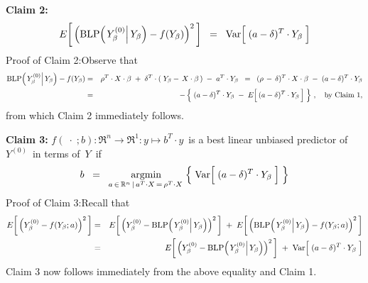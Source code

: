 \begin{enumerate}
	\vskip 0.8cm
	\noindent
	\textbf{Claim 2:}
	\begin{equation*}
	E\!\left[\,\left(\blp\!\left(\left.Y^{(0)}_{\beta}\right\vert Y_{\beta}\right) \overset{{\color{white}.}}{-} f(Y_{\beta})\right)^{2}\,\right]
	\;\; = \;\;
		\Var\!\left[\;(a \overset{{\color{white}.}}{-} \delta)^{T}\cdot Y_{\beta}\;\right]
	\end{equation*}
	Proof of Claim 2:\quad Observe that
	\begin{eqnarray*}
	\blp\!\left(\left.Y^{(0)}_{\beta}\right\vert Y_{\beta}\right) - f(Y_{\beta})
	&=&
		\rho^{T} \cdot X \cdot \beta \; + \; \delta^{T}\cdot(\;Y_{\beta} - \,X\cdot\beta\,) \; - \; a^{T} \cdot Y_{\beta}
	\;\; = \;\;
		(\rho \, - \, \delta)^{T} \cdot X \cdot \beta \; - \; (a - \delta)^{T} \cdot Y_{\beta}
	\\
	&=&
		- \left\{\;
			(a - \delta)^{T} \cdot Y_{\beta} \; - \; E\!\left[\,(a \overset{{\color{white}.}}{-} \delta)^{T} \cdot Y_{\beta}\,\right]
			 \;\right\}\,,
		\quad\textnormal{by Claim 1},
	\end{eqnarray*}
	from which Claim 2 immediately follows.

	\vskip 0.5cm
	\noindent
	\textbf{Claim 3:}\quad
	$f(\;\cdot\;;b) : \Re^{n} \longrightarrow \Re^{1} : y \longmapsto b^{T} \cdot y$\,
	is a best linear unbiased predictor of \,$Y^{(0)}$\, in terms of \,$Y$\, if
	\begin{equation*}
	b \;\; = \;\;
		\underset{a\,\in\,\Re^{n}\,\left\vert\,a^{T} \cdot X \,=\, \rho^{T} \cdot X\right.}{\textnormal{argmin}}
		\left\{\;
			\Var\!\left[\;(a \overset{{\color{white}.}}{-} \delta)^{T}\cdot Y_{\beta}\;\right]
			\;\right\}
	\end{equation*}
	Proof of Claim 3:\quad Recall that
	\begin{eqnarray*}
	E\!\left[\,\left(Y^{(0)}_{\beta} \overset{{\color{white}.}}{-} f(Y_{\beta};a)\right)^{2}\,\right]
	& = &
		E\!\left[\,
			\left(Y^{(0)}_{\beta}
			\overset{{\color{white}.}}{-}
			\blp\!\left(\left.Y^{(0)}_{\beta}\right\vert Y_{\beta}\right)\right)^{2}
			\,\right]
		\; + \;
		E\!\left[\,
			\left(\blp\!\left(\left.Y^{(0)}_{\beta}\right\vert Y_{\beta}\right)
			\overset{{\color{white}.}}{-}
			f(Y_{\beta};a)\right)^{2}
			\,\right]
	\\
	& = &
		E\!\left[\,
			\left(Y^{(0)}_{\beta}
			\overset{{\color{white}.}}{-}
			\blp\!\left(\left.Y^{(0)}_{\beta}\right\vert Y_{\beta}\right)\right)^{2}
			\,\right]
		\; + \;
		\Var\!\left[\;(a \overset{{\color{white}.}}{-} \delta)^{T}\cdot Y_{\beta}\;\right]
	\end{eqnarray*}
	Claim 3 now follows immediately from the above equality and Claim 1.


\end{enumerate}
